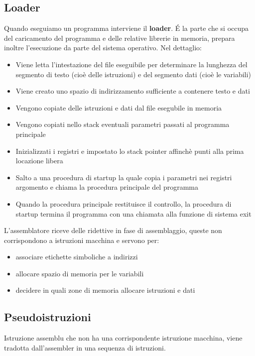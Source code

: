 \documentclass[12pt, a4paper, openany]{book}
\begin{document}
\subsection{Loader}
Quando eseguiamo un programma interviene il \textbf{loader}.
\'E la parte che si occupa del caricamento del programma e delle relative librerie in memoria,
prepara inoltre l'esecuzione da parte del sistema operativo.
Nel dettaglio: \begin{itemize}
    \item Viene letta l'intestazione del file eseguibile per determinare la lunghezza
    del segmento di testo (cioè delle istruzioni) e del segmento dati (cioè le variabili)
    \item Viene creato uno spazio di indirizzamento sufficiente a contenere testo e dati
    \item Vengono copiate delle istruzioni e dati dal file esegubile in memoria
    \item Vengono copiati nello stack eventuali parametri passati al programma principale
    \item Inizializzati i registri e impostato lo stack pointer affinchè punti alla prima
    locazione libera
    \item Salto a una procedura di startup la quale copia i parametri nei registri argomento
    e chiama la procedura principale del programma
    \item Quando la procedura principale restituisce il controllo, la procedura di
    startup termina il programma con una chiamata alla funzione di sistema exit
\end{itemize}

L'assemblatore riceve delle ridettive in fase di assemblaggio, queste non corrispondono
a istruzioni macchina e servono per: \begin{itemize}
    \item associare etichette simboliche a indirizzi
    \item allocare spazio di memoria per le variabili
    \item decidere in quali zone di memoria allocare istruzioni e dati
\end{itemize}

\subsection{Pseudoistruzioni}
Istruzione assemblu che non ha una corrispondente istruzione macchina, viene tradotta
dall'assembler in una sequenza di istruzioni.
\end{document}
